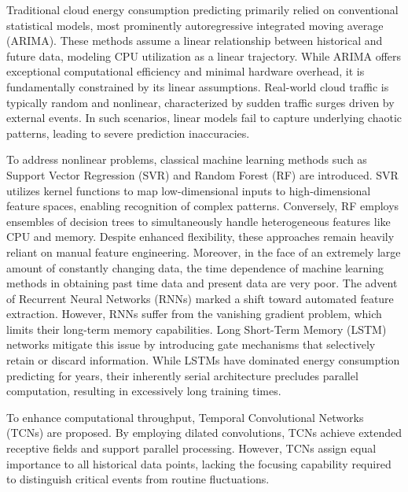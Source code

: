 \documentclass[conference]{{IEEEtran}}
\begin{document}
Traditional cloud energy consumption predicting primarily relied on conventional statistical models, most prominently autoregressive integrated moving average (ARIMA). These methods assume a linear relationship between historical and future data\cite{boroumand2025heuristic}, modeling CPU utilization as a linear trajectory\cite{elhabyb2024machine}. While ARIMA offers exceptional computational efficiency and minimal hardware overhead, it is fundamentally constrained by its linear assumptions. Real-world cloud traffic is typically random and nonlinear, characterized by sudden traffic surges driven by external events. In such scenarios, linear models fail to capture underlying chaotic patterns, leading to severe prediction inaccuracies.

To address nonlinear problems, classical machine learning methods such as Support Vector Regression (SVR)\cite{ciampi2024energy} and Random Forest (RF)\cite{abualigah2024improved} are introduced. SVR utilizes kernel functions to map low-dimensional inputs to high-dimensional feature spaces, enabling recognition of complex patterns. Conversely, RF employs ensembles of decision trees to simultaneously handle heterogeneous features like CPU and memory\cite{yang2025cam}\cite{adegboye2024dgs}. Despite enhanced flexibility, these approaches remain heavily reliant on manual feature engineering. Moreover, in the face of an extremely large amount of constantly changing data, the time dependence of machine learning methods in obtaining past time data and present data are very poor\cite{du2024metaheuristic}. The advent of Recurrent Neural Networks (RNNs)\cite{boroumand2025heuristic} marked a shift toward automated feature extraction. However, RNNs suffer from the vanishing gradient problem, which limits their long-term memory capabilities. Long Short-Term Memory (LSTM)\cite{noorizadegan2025practitioner}\cite{zhang2024optimizing} networks mitigate this issue by introducing gate mechanisms that selectively retain or discard information. While LSTMs have dominated energy consumption predicting for years, their inherently serial architecture precludes parallel computation, resulting in excessively long training times.

To enhance computational throughput, Temporal Convolutional Networks (TCNs)\cite{wu2024hotspot} are proposed. By employing dilated convolutions, TCNs achieve extended receptive fields and support parallel processing. However, TCNs assign equal importance to all historical data points, lacking the focusing capability required to distinguish critical events from routine fluctuations.
\end{document}

